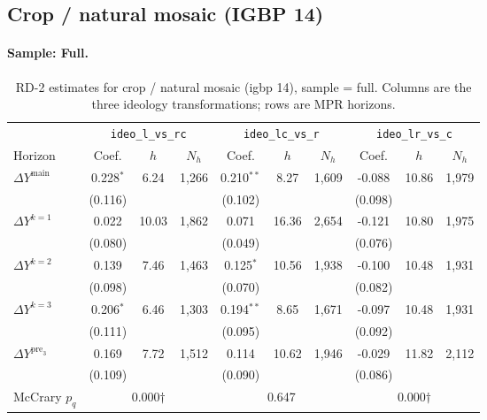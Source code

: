 \documentclass[11pt]{article}
\begin{document}
\clearpage
\subsection{Crop / natural mosaic (IGBP 14)}
\paragraph{Sample: Full.}
\begin{table}[H]
\centering
\scriptsize
\caption{RD-2 estimates for crop / natural mosaic (igbp 14), sample = full.
Columns are the three ideology transformations; rows are MPR horizons.}
\label{tab:rd2_crop_nature_all}
\begin{tabular}{l ccc ccc ccc}
\toprule
 & \multicolumn{3}{c}{\texttt{ideo\_l\_vs\_rc}}
 & \multicolumn{3}{c}{\texttt{ideo\_lc\_vs\_r}}
 & \multicolumn{3}{c}{\texttt{ideo\_lr\_vs\_c}} \\
\cmidrule(lr){2-4} \cmidrule(lr){5-7} \cmidrule(lr){8-10}
Horizon & Coef. & $h$ & $N_h$ & Coef. & $h$ & $N_h$ & Coef. & $h$ & $N_h$ \\
\midrule
$\Delta Y^{\text{main}}$ & 0.228$^{*}$ & 6.24 & 1,266 & 0.210$^{**}$ & 8.27 & 1,609 & -0.088 & 10.86 & 1,979 \\
 & (0.116) &  &  & (0.102) &  &  & (0.098) &  &  \\
\addlinespace[1pt]
$\Delta Y^{k=1}$ & 0.022 & 10.03 & 1,862 & 0.071 & 16.36 & 2,654 & -0.121 & 10.80 & 1,975 \\
 & (0.080) &  &  & (0.049) &  &  & (0.076) &  &  \\
\addlinespace[1pt]
$\Delta Y^{k=2}$ & 0.139 & 7.46 & 1,463 & 0.125$^{*}$ & 10.56 & 1,938 & -0.100 & 10.48 & 1,931 \\
 & (0.098) &  &  & (0.070) &  &  & (0.082) &  &  \\
\addlinespace[1pt]
$\Delta Y^{k=3}$ & 0.206$^{*}$ & 6.46 & 1,303 & 0.194$^{**}$ & 8.65 & 1,671 & -0.097 & 10.48 & 1,931 \\
 & (0.111) &  &  & (0.095) &  &  & (0.092) &  &  \\
\addlinespace[1pt]
$\Delta Y^{\text{pre}_3}$ & 0.169 & 7.72 & 1,512 & 0.114 & 10.62 & 1,946 & -0.029 & 11.82 & 2,112 \\
 & (0.109) &  &  & (0.090) &  &  & (0.086) &  &  \\
\addlinespace[1pt]
\midrule
McCrary $p_q$ & \multicolumn{3}{c}{0.000$\dagger$} & \multicolumn{3}{c}{0.647} & \multicolumn{3}{c}{0.000$\dagger$} \\
\bottomrule
\end{tabular}
\end{table}
\end{document}
